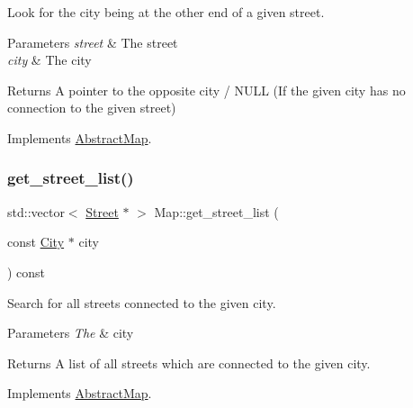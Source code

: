 Look for the city being at the other end of a given street. 


\begin{DoxyParams}{Parameters}
{\em street} & The street \\
\hline
{\em city} & The city \\
\hline
\end{DoxyParams}
\begin{DoxyReturn}{Returns}
A pointer to the opposite city / N\+U\+LL (If the given city has no connection to the given street) 
\end{DoxyReturn}


Implements \hyperlink{class_abstract_map_ab372998d6ab42b67d1fd7b97b2c380f2}{Abstract\+Map}.

\mbox{\label{class_map_a24c8fa29273d26e301f889ab81d696e3}} 
\subsubsection{\texorpdfstring{get\+\_\+street\+\_\+list()}{get\_street\_list()}}
{\footnotesize\ttfamily std\+::vector$<$ \hyperlink{class_street}{Street} $\ast$ $>$ Map\+::get\+\_\+street\+\_\+list (\begin{DoxyParamCaption}\item[{const \hyperlink{class_city}{City} $\ast$}]{city }\end{DoxyParamCaption}) const\hspace{0.3cm}{\ttfamily [virtual]}}



Search for all streets connected to the given city. 


\begin{DoxyParams}{Parameters}
{\em The} & city \\
\hline
\end{DoxyParams}
\begin{DoxyReturn}{Returns}
A list of all streets which are connected to the given city. 
\end{DoxyReturn}


Implements \hyperlink{class_abstract_map_a228d43b47211f3836fdc66760831d61d}{Abstract\+Map}.

\mbox{\label{class_map_aac96173f49b430365521708440055772}} 
